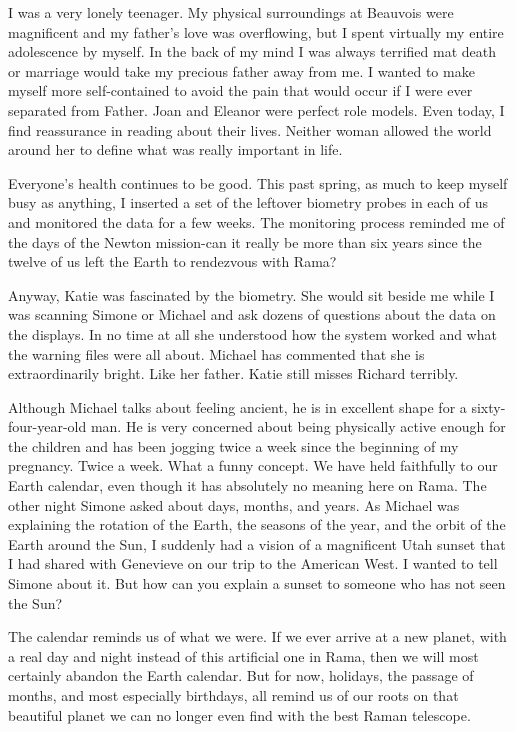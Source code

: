 \documentclass[]{article}
\begin{document}
I was a very lonely teenager.  My physical surroundings at Beauvois were magnificent and my father’s love was overflowing, but I spent virtually my entire adolescence by myself.  In the back of my mind I was always terrified mat death or marriage would take my precious father away from me.  I wanted to make myself more self-contained to avoid the pain that would occur if I were ever separated from Father.  Joan and Eleanor were perfect role models.  Even today, I find reassurance in reading about their lives.  Neither woman allowed the world around her to define what was really important in life.

Everyone’s health continues to be good.  This past spring, as much to keep myself busy as anything, I inserted a set of the leftover biometry probes in each of us and monitored the data for a few weeks.  The monitoring process reminded me of the days of the Newton mission-can it really be more than six years since the twelve of us left the Earth to rendezvous with Rama?

Anyway, Katie was fascinated by the biometry.  She would sit beside me while I was scanning Simone or Michael and ask dozens of questions about the data on the displays.  In no time at all she understood how the system worked and what the warning files were all about.  Michael has commented that she is extraordinarily bright.  Like her father.  Katie still misses Richard terribly.

Although Michael talks about feeling ancient, he is in excellent shape for a sixty-four-year-old man.  He is very concerned about being physically active enough for the children and has been jogging twice a week since the beginning of my pregnancy.  Twice a week.  What a funny concept.  We have held faithfully to our Earth calendar, even though it has absolutely no meaning here on Rama.  The other night Simone asked about days, months, and years.  As Michael was explaining the rotation of the Earth, the seasons of the year, and the orbit of the Earth around the Sun, I suddenly had a vision of a magnificent Utah sunset that I had shared with Genevieve on our trip to the American West.  I wanted to tell Simone about it.  But how can you explain a sunset to someone who has not seen the Sun?

The calendar reminds us of what we were.  If we ever arrive at a new planet, with a real day and night instead of this artificial one in Rama, then we will most certainly abandon the Earth calendar.  But for now, holidays, the passage of months, and most especially birthdays, all remind us of our roots on that beautiful planet we can no longer even find with the best Raman telescope.
\end{document}
